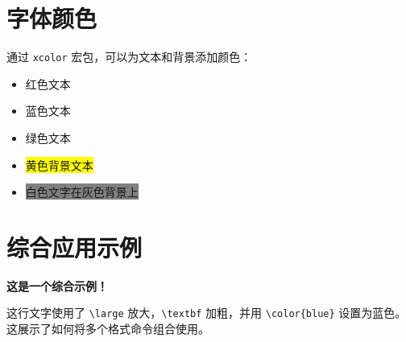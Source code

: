 \documentclass{article}
\begin{document}
\section{字体颜色}
通过 \texttt{xcolor} 宏包，可以为文本和背景添加颜色：
\begin{itemize}
    \item {\color{red}红色文本}
    \item {\color{blue}蓝色文本}
    \item {\color{green}绿色文本}
    \item \colorbox{yellow}{黄色背景文本}
    \item \colorbox{gray}{\color{white}白色文字在灰色背景上}
\end{itemize}

\section{综合应用示例}
\large \textbf{\color{blue}这是一个综合示例！}

这行文字使用了 \texttt{\textbackslash large} 放大，\texttt{\textbackslash textbf} 加粗，并用 \texttt{\textbackslash color\{blue\}} 设置为蓝色。这展示了如何将多个格式命令组合使用。
\end{document}
